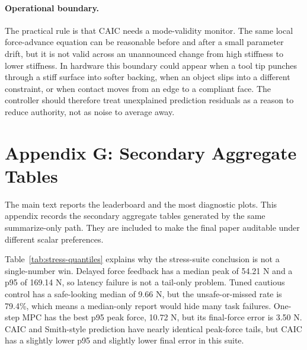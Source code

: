 \documentclass{article}
\newcommand{\caic}{CAIC}
\begin{document}
\paragraph{Operational boundary.}
The practical rule is that \caic{} needs a mode-validity monitor. The same local force-advance equation can be reasonable before and after a small parameter drift, but it is not valid across an unannounced change from high stiffness to lower stiffness. In hardware this boundary could appear when a tool tip punches through a stiff surface into softer backing, when an object slips into a different constraint, or when contact moves from an edge to a compliant face. The controller should therefore treat unexplained prediction residuals as a reason to reduce authority, not as noise to average away.

\clearpage
\section{Appendix G: Secondary Aggregate Tables}

The main text reports the leaderboard and the most diagnostic plots. This appendix records the secondary aggregate tables generated by the same summarize-only path. They are included to make the final paper auditable under different scalar preferences.

\begin{table}[t]
    \centering
    \scriptsize
    \caption{Large stress-suite quantiles and final-force error. P50, P90, P95, and Max are peak force in Newtons. Unsafe/miss counts both peak force above 12 N and no-contact runs.}
    \label{tab:stress-quantiles}
    \resizebox{\linewidth}{!}{}
\end{table}

Table~\ref{tab:stress-quantiles} explains why the stress-suite conclusion is not a single-number win. Delayed force feedback has a median peak of 54.21 N and a p95 of 169.14 N, so latency failure is not a tail-only problem. Tuned cautious control has a safe-looking median of 9.66 N, but the unsafe-or-missed rate is 79.4\%, which means a median-only report would hide many task failures. One-step MPC has the best p95 peak force, 10.72 N, but its final-force error is 3.50 N. \caic{} and Smith-style prediction have nearly identical peak-force tails, but \caic{} has a slightly lower p95 and slightly lower final error in this suite.

\begin{table}[t]
    \centering
    \scriptsize
    \caption{Model-mismatch latency boundary. P95 entries are peak force in Newtons; unsafe is peak force above 12 N. AWA denotes adaptive windowed advancement.}
    \label{tab:mismatch-latency}
    \resizebox{\linewidth}{!}{}
\end{table}
\end{document}
